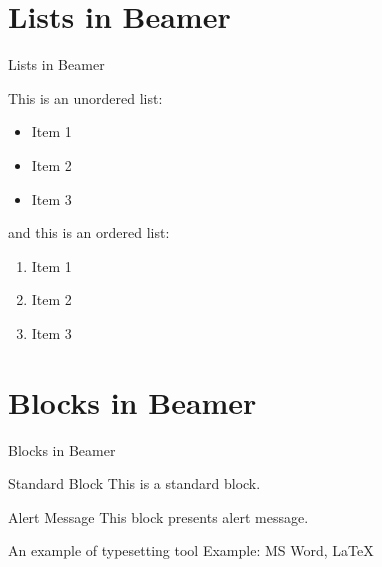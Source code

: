 \documentclass{beamer}
\begin{document}
\section{Lists in Beamer}
\begin{frame}{Lists in Beamer}

This is an unordered list:
\begin{itemize}
    \item Item 1
    \item Item 2
    \item Item 3
\end{itemize}

and this is an ordered list:
\begin{enumerate}
    \item Item 1
    \item Item 2
    \item Item 3
\end{enumerate}

\end{frame}

\section{Blocks in Beamer}
\begin{frame}{Blocks in Beamer}
    \begin{block}{Standard Block}
        This is a standard block.
    \end{block}
    \begin{alertblock}{Alert Message}
        This block presents alert message.
    \end{alertblock}
    \begin{exampleblock}{An example of typesetting tool}
        Example: MS Word, \LaTeX{}
    \end{exampleblock}
\end{frame} 
\end{document}
